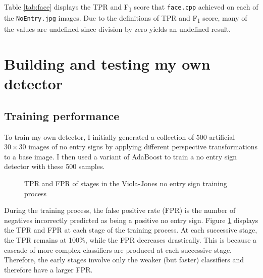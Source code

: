 \documentclass[twocolumn, 10pt, a4paper]{article}
\begin{document}
Table \ref{tab:face} displays the TPR and F\textsubscript{1} score that \texttt{face.cpp} achieved on each of the \texttt{NoEntry\textasteriskcentered.jpg} images.
Due to the definitions of TPR and F\textsubscript{1} score, many of the values are undefined since division by zero yields an undefined result.

\clearpage

\section{Building and testing my own detector}

\subsection{Training performance}

To train my own detector, I initially generated a collection of 500 artificial $30 \times 30$ images of no entry signs by applying different perspective transformations to a base image.
I then used a variant of AdaBoost to train a no entry sign detector with these 500 samples.

\begin{figure}[h]
  \dataset
  \caption{TPR and FPR of stages in the Viola-Jones no entry sign training process}\label{vj_training}
\end{figure}

During the training process, the false positive rate (FPR) is the number of negatives incorrectly predicted as being a positive no entry sign.
Figure \ref{vj_training} displays the TPR and FPR at each stage of the training process.
At each successive stage, the TPR remains at 100\%, while the FPR decreases drastically.
This is because a cascade of more complex classifiers are produced at each successive stage.
Therefore, the early stages involve only the weaker (but faster) classifiers and therefore have a larger FPR.
 
\end{document}
